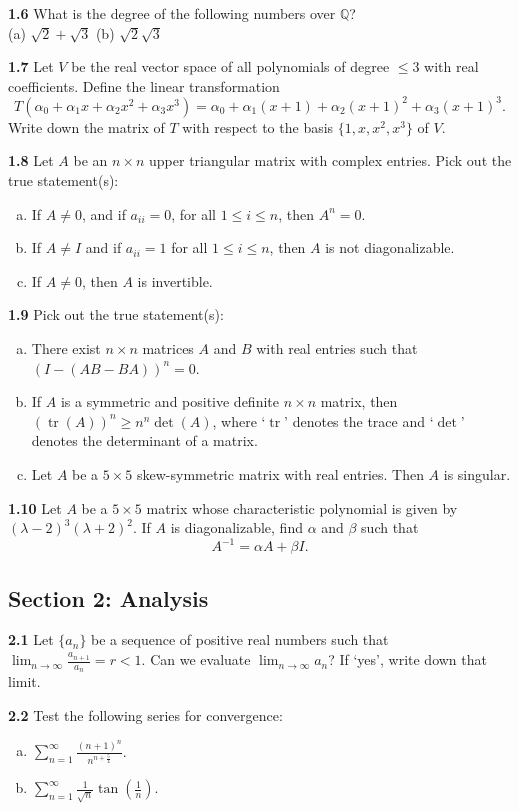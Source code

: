 \documentclass[11pt,a4paper]{article}
\newcommand{\Q}{\mathbb{Q}}
\newcommand{\tr}{\operatorname{tr}}
\newcommand{\examsec}[1]{%
  \subsection*{#1}
  \vspace{-2pt}
}
\newcommand{\qitem}[1]{\par\medskip\noindent\textbf{#1}\hspace{0.5em}}
\begin{document}
\qitem{1.6} What is the degree of the following numbers over $\Q$?\\
(a) $\sqrt{2} + \sqrt{3}$ \qquad (b) $\sqrt{2}\sqrt{3}$

\qitem{1.7} Let $V$ be the real vector space of all polynomials of degree $\le 3$ with real coefficients. Define the linear transformation
\[
  T(\alpha_0 + \alpha_1 x + \alpha_2 x^2 + \alpha_3 x^3) = \alpha_0 + \alpha_1(x+1) + \alpha_2(x+1)^2 + \alpha_3(x+1)^3.
\]
Write down the matrix of $T$ with respect to the basis $\{1, x, x^2, x^3\}$ of $V$.

\qitem{1.8} Let $A$ be an $n \times n$ upper triangular matrix with complex entries. Pick out the true statement(s):
\begin{enumerate}[(a)]
  \item If $A \neq 0$, and if $a_{ii} = 0$, for all $1 \le i \le n$, then $A^n = 0$.
  \item If $A \neq I$ and if $a_{ii} = 1$ for all $1 \le i \le n$, then $A$ is not diagonalizable.
  \item If $A \neq 0$, then $A$ is invertible.
\end{enumerate}

\qitem{1.9} Pick out the true statement(s):
\begin{enumerate}[(a)]
  \item There exist $n \times n$ matrices $A$ and $B$ with real entries such that $(I - (AB - BA))^n = 0$.
  \item If $A$ is a symmetric and positive definite $n \times n$ matrix, then $(\tr(A))^n \ge n^n \det(A)$, where `$\tr$' denotes the trace and `$\det$' denotes the determinant of a matrix.
  \item Let $A$ be a $5 \times 5$ skew-symmetric matrix with real entries. Then $A$ is singular.
\end{enumerate}

\qitem{1.10} Let $A$ be a $5 \times 5$ matrix whose characteristic polynomial is given by $(\lambda - 2)^3(\lambda + 2)^2$. If $A$ is diagonalizable, find $\alpha$ and $\beta$ such that
\[
  A^{-1} = \alpha A + \beta I.
\]

\examsec{Section 2: Analysis}

\qitem{2.1} Let $\{a_n\}$ be a sequence of positive real numbers such that $\lim_{n \to \infty} \frac{a_{n+1}}{a_n} = r < 1$. Can we evaluate $\lim_{n \to \infty} a_n$? If `yes', write down that limit.

\qitem{2.2} Test the following series for convergence:
\begin{enumerate}[(a)]
  \item $\displaystyle\sum_{n=1}^{\infty} \frac{(n+1)^n}{n^{n+\frac{5}{4}}}$.
  \item $\displaystyle\sum_{n=1}^{\infty} \frac{1}{\sqrt{n}}\tan\left(\frac{1}{n}\right)$.
\end{enumerate}
\end{document}
